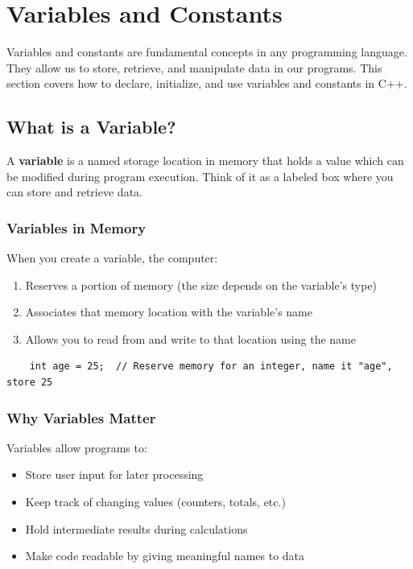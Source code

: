 \section{Variables and Constants}

Variables and constants are fundamental concepts in any programming language. They allow us to store, retrieve, and manipulate data in our programs. This section covers how to declare, initialize, and use variables and constants in C++.

\subsection{What is a Variable?}

A \textbf{variable} is a named storage location in memory that holds a value which can be modified during program execution. Think of it as a labeled box where you can store and retrieve data.

\subsubsection{Variables in Memory}

When you create a variable, the computer:
\begin{enumerate}
	\item Reserves a portion of memory (the size depends on the variable's type)
	\item Associates that memory location with the variable's name
	\item Allows you to read from and write to that location using the name
\end{enumerate}

\begin{lstlisting}
	int age = 25;  // Reserve memory for an integer, name it "age", store 25
\end{lstlisting}

\subsubsection{Why Variables Matter}

Variables allow programs to:
\begin{itemize}
	\item Store user input for later processing
	\item Keep track of changing values (counters, totals, etc.)
	\item Hold intermediate results during calculations
	\item Make code readable by giving meaningful names to data
\end{itemize}

